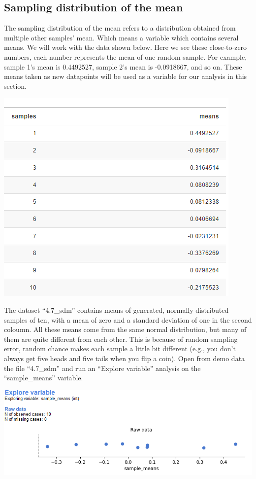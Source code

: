 \documentclass[
]{book}
\begin{document}
\hypertarget{sampling-distribution-of-the-mean}{%
\subsection{Sampling distribution of the mean}\label{sampling-distribution-of-the-mean}}

The sampling distribution of the mean refers to a distribution obtained from multiple other samples' mean. Which means a variable which contains several means. We will work with the data shown below. Here we see these close-to-zero numbers, each number represents the mean of one random sample. For example, sample 1's mean is 0.4492527, sample 2's mean is -0.0918667, and so on. These means taken as new datapoints will be used as a variable for our analysis in this section.

\includegraphics{img/ch4/4.6samplemeans.png}

The dataset ``4.7\_sdm'' contains means of generated, normally distributed samples of ten, with a mean of zero and a standard deviation of one in the second coloumn. All these means come from the same normal distribution, but many of them are quite different from each other. This is because of random sampling error, random chance makes each sample a little bit different (e.g., you don't always get five heads and five tails when you flip a coin). Open from demo data the file ``4.7\_sdm'' and run an ``Explore variable'' analysis on the ``sample\_means'' variable.

\includegraphics{img/ch4/4.6expvarsamplemeansRAW.png}
\end{document}
